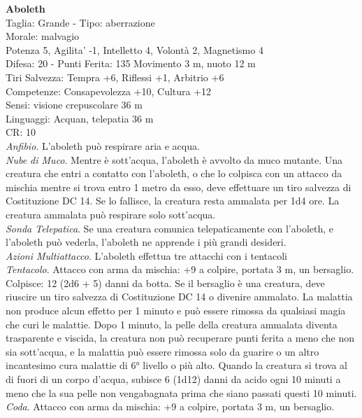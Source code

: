 \begin{multicols}{2}
\textbf{Aboleth}\\
Taglia: Grande - \hspace*{0pt}\hfill{Tipo: aberrazione}\\
Morale: malvagio\\
Potenza 5, Agilita' -1, Intelletto 4, Volontà 2, Magnetismo 4\\
Difesa: 20 - \hspace*{0pt}\hfill{Punti Ferita: 135}
Movimento 3 m, nuoto 12 m\\
Tiri Salvezza: Tempra +6, Riflessi +1, Arbitrio +6\\
Competenze: Consapevolezza +10, Cultura +12\\
Sensi: visione crepuscolare 36 m\\
Linguaggi: Acquan, telepatia 36 m\\
CR: 10\\
\textit{Anfibio}. L’aboleth può respirare aria e acqua.\\
\textit{Nube di Muco}. Mentre è sott’acqua, l’aboleth è avvolto da muco mutante. Una creatura che entri a contatto con l’aboleth, o che lo colpisca con un attacco da mischia mentre si trova entro 1 metro da esso, deve effettuare un tiro salvezza di Costituzione DC 14. Se lo fallisce, la creatura resta ammalata per 1d4 ore. La creatura ammalata può respirare solo sott’acqua.\\
\textit{Sonda Telepatica}. Se una creatura comunica telepaticamente con  l’aboleth, e l’aboleth può vederla, l’aboleth ne apprende i più grandi desideri.\\
\textit{Azioni Multiattacco}. L’aboleth effettua tre attacchi con i tentacoli\\
\textit{Tentacolo}. Attacco con arma da mischia: +9 a colpire, portata 3 m, un bersaglio.
Colpisce: 12 (2d6 + 5) danni da botta. Se il bersaglio è una creatura, deve riuscire un tiro salvezza di Costituzione DC 14 o divenire ammalato. La malattia non produce alcun effetto per 1 minuto e può essere rimossa da qualsiasi magia che curi le malattie. Dopo 1 minuto, la pelle della creatura ammalata diventa trasparente e viscida, la creatura non può recuperare punti ferita a meno che non sia sott’acqua, e la malattia può essere rimossa solo da guarire o un altro incantesimo cura malattie di 6° livello o più alto. Quando la creatura si trova al di fuori di un corpo d’acqua, subisce 6 (1d12) danni da acido ogni 10 minuti a meno che la sua pelle non vengabagnata prima che siano passati questi  10 minuti.\\
\textit{Coda}. Attacco con arma da mischia: +9 a colpire, portata 3 m, un bersaglio.

\end{multicols}
